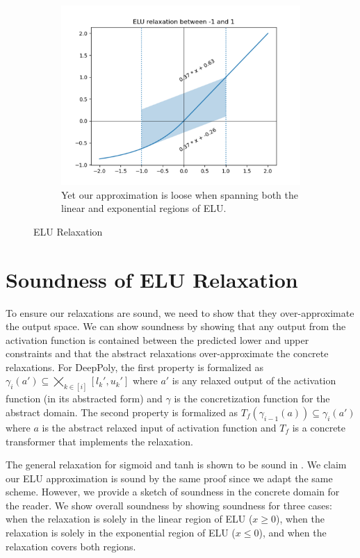 \documentclass{llncs}
\begin{document}
\begin{figure}[t]
    \begin{subfigure}{.48\textwidth}
        \centering
        \includegraphics[width=\linewidth]{elu_mixed_relaxation.png}
        \caption{Yet our approximation is loose when spanning both the linear and exponential regions of ELU.}
        \label{fig:elu_mixed_relax}
    \end{subfigure}
    \caption{ELU Relaxation}
    \label{fig:elu_relax}
\end{figure}

\section{Soundness of ELU Relaxation}
To ensure our relaxations are sound, we need to show that they over-approximate the output space.
We can show soundness by showing that any output from the activation function is contained between the predicted lower and upper constraints and that the abstract relaxations over-approximate the concrete relaxations.
For DeepPoly, the first property is formalized as $\gamma_i(a') \subseteq \bigtimes_{k\in[i]}[l_k',u_k']$ where $a'$ is any relaxed output of the activation function (in its abstracted form) and $\gamma$ is the concretization function for the abstract domain.
The second property is formalized as $T_f(\gamma_{i-1}(a)) \subseteq \gamma_i(a')$ where $a$ is the abstract relaxed input of activation function and $T_f$ is a concrete transformer that implements the relaxation.

The general relaxation for sigmoid and tanh is shown to be sound in \cite{singh2019abstract}.
We claim our ELU approximation is sound by the same proof since we adapt the same scheme.
However, we provide a sketch of soundness in the concrete domain for the reader.
We show overall soundness by showing soundness for three cases: when the relaxation is solely in the linear region of ELU ($x \geq 0$), when the relaxation is solely in the exponential region of ELU ($x \leq 0$), and when the relaxation covers both regions.
\end{document}
